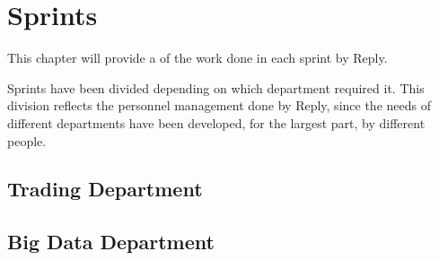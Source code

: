 \chapter{Sprints} \label{section:sprints}
    This chapter will provide a of the work done in each sprint by Reply.
    
    Sprints have been divided depending on which department required it.
    This division reflects the personnel management done by Reply, since the needs of different departments have been developed, for the largest part, by different people.
        
    \section{Trading Department}
        
    \section{Big Data Department}
        

